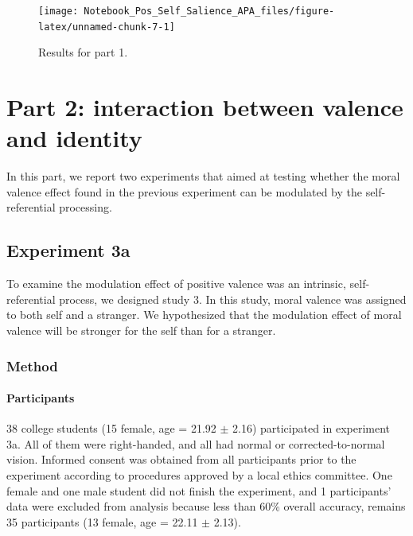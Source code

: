 \documentclass[
  english,
  man]{apa6}
\let\oldparagraph\paragraph
\renewcommand{\paragraph}[1]{\oldparagraph{#1}\mbox{}}
\begin{document}
\begin{figure}
\texttt{[image: Notebook\_Pos\_Self\_Salience\_APA\_files/figure-latex/unnamed-chunk-7-1]} \caption{Results for part 1.}\label{fig:unnamed-chunk-7}
\end{figure}

\hypertarget{part-2-interaction-between-valence-and-identity}{%
\section{Part 2: interaction between valence and identity}\label{part-2-interaction-between-valence-and-identity}}

In this part, we report two experiments that aimed at testing whether the moral valence effect found in the previous experiment can be modulated by the self-referential processing.

\hypertarget{experiment-3a}{%
\subsection{Experiment 3a}\label{experiment-3a}}

To examine the modulation effect of positive valence was an intrinsic, self-referential process, we designed study 3. In this study, moral valence was assigned to both self and a stranger. We hypothesized that the modulation effect of moral valence will be stronger for the self than for a stranger.

\hypertarget{method-4}{%
\subsubsection{Method}\label{method-4}}

\hypertarget{participants-5}{%
\paragraph{Participants}\label{participants-5}}

38 college students (15 female, age = 21.92 \(\pm\) 2.16) participated in experiment 3a. All of them were right-handed, and all had normal or corrected-to-normal vision. Informed consent was obtained from all participants prior to the experiment according to procedures approved by a local ethics committee. One female and one male student did not finish the experiment, and 1 participants' data were excluded from analysis because less than 60\% overall accuracy, remains 35 participants (13 female, age = 22.11 \(\pm\) 2.13).
\end{document}
